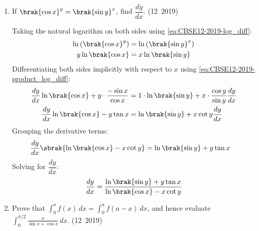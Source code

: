 \begin{enumerate}[label=\thesubsection.\arabic*, ref=\thesubsection.\theenumi]
\item If $\brak{\cos x}^y = \brak{\sin y}^x$, find $\dfrac{dy}{dx}$.
\hfill (12~2019)

\solution
Taking the natural logarithm on both sides using \eqref{eq:CBSE12-2019-log_diff}:
\begin{align}
	\ln\left(\brak{\cos x}^y\right) &= \ln\left(\brak{\sin y}^x\right) \\
	y \ln\brak{\cos x} &= x \ln\brak{\sin y}
\end{align}
Differentiating both sides implicitly with respect to $x$ using \eqref{eq:CBSE12-2019-product_log_diff}:
\begin{align}
	\frac{dy}{dx}\ln\brak{\cos x} + y\cdot\frac{-\sin x}{\cos x} &= 1\cdot\ln\brak{\sin y} + x\cdot\frac{\cos y}{\sin y}\frac{dy}{dx} \\
	\frac{dy}{dx}\ln\brak{\cos x} - y\tan x &= \ln\brak{\sin y} + x\cot y\frac{dy}{dx}
\end{align}
Grouping the derivative terms:
\begin{align}
	\frac{dy}{dx}\sbrak{\ln\brak{\cos x} - x\cot y} &= \ln\brak{\sin y} + y\tan x
\end{align}
Solving for $\dfrac{dy}{dx}$:
\begin{align}
	\frac{dy}{dx} = \frac{\ln\brak{\sin y} + y\tan x}{\ln\brak{\cos x} - x\cot y}
\end{align}



\item Prove that $\displaystyle\int_0^a f(x)\,dx = \int_0^a f(a-x)\,dx$, and hence evaluate $\displaystyle\int_0^{\pi/2}\frac{x}{\sin x+\cos x}\,dx$.
\hfill (12~2019)


\end{enumerate}
